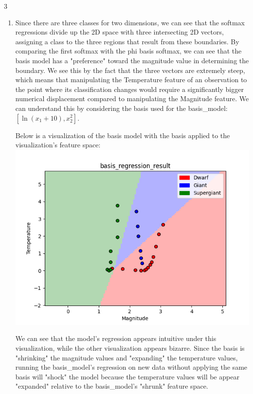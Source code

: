 \documentclass[submit]{harvardml}
\begin{document}
\begin{sol}{}{3}
  \begin{enumerate}
    \item Since there are three classes for two dimensions, 
    we can see that the softmax regressions divide up the 2D space with
    three intersecting 2D vectors, assigning a class to the three regions
    that result from these boundaries. By comparing the first softmax 
    with the phi basis softmax, we can see that the basis model has a "preference"
    toward the magnitude value in determining the boundary. We see this by
    the fact that the three vectors are extremely steep, which means that
    manipulating the Temperature feature of an observation to the point where
    its classification changes would require a significantly bigger numerical
    displacement compared to manipulating the Magnitude feature. 
    We can understand this by considering the basis used for the basis\_model:
    $[\ln(x_1 + 10), x_2^2]$.

    Below is a visualization of the basis model
    with the basis applied to the visualization's feature space:
    \includegraphics[width=1\linewidth]{images/basis_regression_basis_result.png}

    We can see that the model's regression appears intuitive under this visualization,
    while the other visualization appears bizarre. Since the basis is "shrinking"
    the magnitude values and "expanding" the temperature values, running the basis\_model's
    regression on new data without applying the same basis will "shock" the model because the
    temperature values will be appear "expanded" relative to the basis\_model's "shrunk"
    feature space.


\end{enumerate}
\end{sol}
\end{document}
